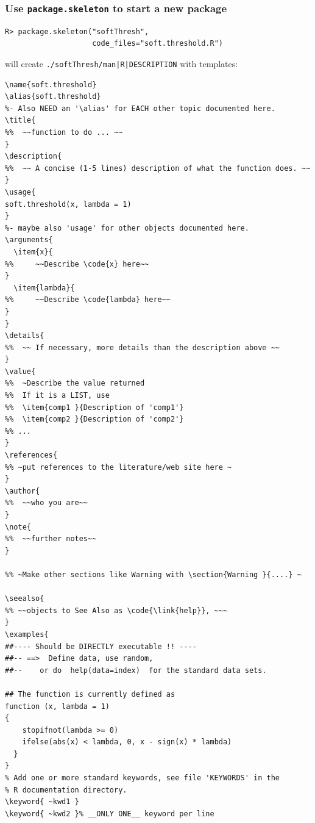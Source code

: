 \documentclass{beamer}
\begin{document}
\begin{frame}[containsverbatim]
  \frametitle{Use \texttt{package.skeleton} to start a new package}
\begin{verbatim}
R> package.skeleton("softThresh",
                    code_files="soft.threshold.R")
\end{verbatim}
  will create \texttt{./softThresh/man|R|DESCRIPTION} with templates:
  \tiny
\begin{verbatim}
\name{soft.threshold}
\alias{soft.threshold}
%- Also NEED an '\alias' for EACH other topic documented here.
\title{
%%  ~~function to do ... ~~
}
\description{
%%  ~~ A concise (1-5 lines) description of what the function does. ~~
}
\usage{
soft.threshold(x, lambda = 1)
}
%- maybe also 'usage' for other objects documented here.
\arguments{
  \item{x}{
%%     ~~Describe \code{x} here~~
}
  \item{lambda}{
%%     ~~Describe \code{lambda} here~~
}
}
\details{
%%  ~~ If necessary, more details than the description above ~~
}
\value{
%%  ~Describe the value returned
%%  If it is a LIST, use
%%  \item{comp1 }{Description of 'comp1'}
%%  \item{comp2 }{Description of 'comp2'}
%% ...
}
\references{
%% ~put references to the literature/web site here ~
}
\author{
%%  ~~who you are~~
}
\note{
%%  ~~further notes~~
}

%% ~Make other sections like Warning with \section{Warning }{....} ~

\seealso{
%% ~~objects to See Also as \code{\link{help}}, ~~~
}
\examples{
##---- Should be DIRECTLY executable !! ----
##-- ==>  Define data, use random,
##--	or do  help(data=index)  for the standard data sets.

## The function is currently defined as
function (x, lambda = 1) 
{
    stopifnot(lambda >= 0)
    ifelse(abs(x) < lambda, 0, x - sign(x) * lambda)
  }
}
% Add one or more standard keywords, see file 'KEYWORDS' in the
% R documentation directory.
\keyword{ ~kwd1 }
\keyword{ ~kwd2 }% __ONLY ONE__ keyword per line
\end{verbatim}
\end{frame}
\end{document}

